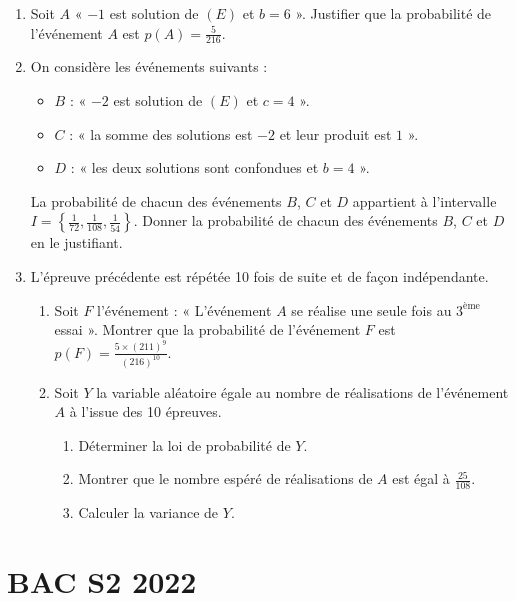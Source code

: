 \documentclass[12pt,a4paper]{article}
\begin{document}
\begin{enumerate}
    \item Soit $A$ « $-1$ est solution de $(E)$ et $b = 6$ ». Justifier que la probabilité de l’événement $A$ est $p(A) = \frac{5}{216}$.
    \item On considère les événements suivants :
    \begin{itemize}
        \item $B$ : « $-2$ est solution de $(E)$ et $c = 4$ ».
        \item $C$ : « la somme des solutions est $-2$ et leur produit est $1$ ».
        \item $D$ : « les deux solutions sont confondues et $b = 4$ ».
    \end{itemize}
    La probabilité de chacun des événements $B$, $C$ et $D$ appartient à l’intervalle $I = \left\{ \frac{1}{72}, \frac{1}{108}, \frac{1}{54} \right\}$. Donner la probabilité de chacun des événements $B$, $C$ et $D$ en le justifiant.
    \item L’épreuve précédente est répétée 10 fois de suite et de façon indépendante. 
    \begin{enumerate}
        \item Soit $F$ l’événement : « L’événement $A$ se réalise une seule fois au $3^{\text{ème}}$ essai ». Montrer que la probabilité de l’événement $F$ est $p(F) = \frac{5 \times (211)^9}{(216)^{10}}$. 
        \item Soit $Y$ la variable aléatoire égale au nombre de réalisations de l’événement $A$ à l’issue des 10 épreuves. 
        \begin{enumerate}
            \item Déterminer la loi de probabilité de $Y$.
            \item Montrer que le nombre espéré de réalisations de $A$ est égal à $\frac{25}{108}$.
            \item Calculer la variance de $Y$.
        \end{enumerate}
    \end{enumerate}
\end{enumerate}
\section*{\quad BAC S2 2022}
\end{document}
